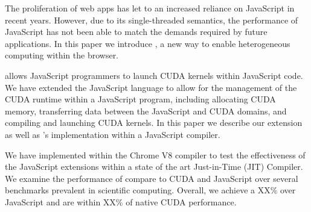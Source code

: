 
The proliferation of web apps has let to an increased reliance on JavaScript in
recent years. However, due to its single-threaded semantics, the performance of
JavaScript has not been able to match the demands required by future applications. In
this paper we introduce \name, a new way to enable heterogeneous computing
within the browser.

\name allows JavaScript programmers to launch CUDA kernels within JavaScript
code. We have extended the JavaScript language to allow for the management of
the CUDA runtime within a JavaScript program, including allocating CUDA memory,
transferring data between the JavaScript and CUDA domains, and compiling and
launching CUDA kernels. In this paper we describe our extension as well as
\name's
implementation within a JavaScript compiler.

We have implemented \name within the Chrome V8 compiler
to test the effectiveness of the JavaScript extensions within a state of the art
Just-in-Time (JIT) Compiler. We examine the performance of \name compare to CUDA
and JavaScript over several benchmarks prevalent in scientific computing.
Overall, we achieve a XX\% over JavaScript and are within XX\% of native CUDA
performance.

